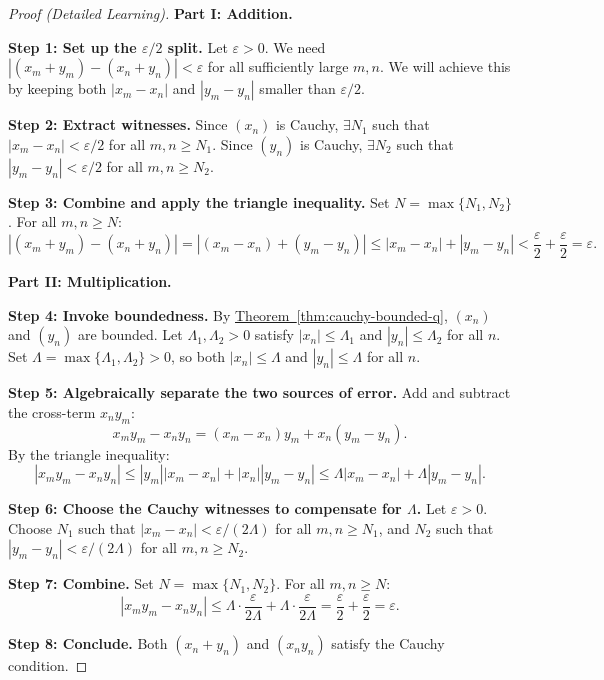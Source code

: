 \begin{proof}[Proof (Detailed Learning)]
\textbf{Part I: Addition.}

\textbf{Step 1: Set up the $\varepsilon/2$ split.}
Let $\varepsilon > 0$.  We need $|(x_m+y_m)-(x_n+y_n)| < \varepsilon$
for all sufficiently large $m,n$.  We will achieve this by keeping both
$|x_m-x_n|$ and $|y_m-y_n|$ smaller than $\varepsilon/2$.

\textbf{Step 2: Extract witnesses.}
Since $(x_n)$ is Cauchy, $\exists N_1$ such that $|x_m-x_n|<\varepsilon/2$
for all $m,n \geq N_1$.
Since $(y_n)$ is Cauchy, $\exists N_2$ such that $|y_m-y_n|<\varepsilon/2$
for all $m,n \geq N_2$.

\textbf{Step 3: Combine and apply the triangle inequality.}
Set $N = \max\{N_1, N_2\}$.  For all $m, n \geq N$:
\[
|(x_m + y_m) - (x_n + y_n)|
= |(x_m - x_n) + (y_m - y_n)|
\leq |x_m - x_n| + |y_m - y_n|
< \frac{\varepsilon}{2} + \frac{\varepsilon}{2} = \varepsilon.
\]

\textbf{Part II: Multiplication.}

\textbf{Step 4: Invoke boundedness.}
By \hyperref[thm:cauchy-bounded-q]{Theorem~\ref*{thm:cauchy-bounded-q}},
$(x_n)$ and $(y_n)$ are bounded.  Let $\Lambda_1, \Lambda_2 > 0$ satisfy
$|x_n| \leq \Lambda_1$ and $|y_n| \leq \Lambda_2$ for all $n$.
Set $\Lambda = \max\{\Lambda_1, \Lambda_2\} > 0$, so both $|x_n| \leq \Lambda$
and $|y_n| \leq \Lambda$ for all $n$.

\textbf{Step 5: Algebraically separate the two sources of error.}
Add and subtract the cross-term $x_n y_m$:
\[
x_m y_m - x_n y_n
= (x_m - x_n)y_m + x_n(y_m - y_n).
\]
By the triangle inequality:
\[
|x_m y_m - x_n y_n|
\leq |y_m||x_m - x_n| + |x_n||y_m - y_n|
\leq \Lambda|x_m - x_n| + \Lambda|y_m - y_n|.
\]

\textbf{Step 6: Choose the Cauchy witnesses to compensate for $\Lambda$.}
Let $\varepsilon > 0$.  Choose $N_1$ such that $|x_m-x_n| < \varepsilon/(2\Lambda)$
for all $m, n \geq N_1$, and $N_2$ such that $|y_m-y_n| < \varepsilon/(2\Lambda)$
for all $m, n \geq N_2$.

\textbf{Step 7: Combine.}
Set $N = \max\{N_1, N_2\}$.  For all $m, n \geq N$:
\[
|x_m y_m - x_n y_n|
\leq \Lambda \cdot \frac{\varepsilon}{2\Lambda} + \Lambda \cdot \frac{\varepsilon}{2\Lambda}
= \frac{\varepsilon}{2} + \frac{\varepsilon}{2} = \varepsilon.
\]

\textbf{Step 8: Conclude.}
Both $(x_n + y_n)$ and $(x_n y_n)$ satisfy the Cauchy condition.
\end{proof}


